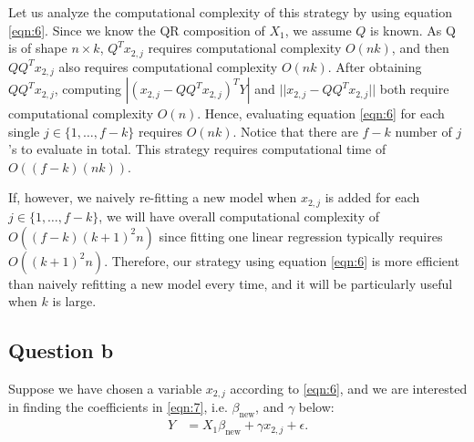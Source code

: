 \documentclass[12pt]{article}
\newcommand{\xln}[1]{x_{#1}}
\newcommand{\bet}{\beta}
\newcommand{\betln}[1]{\bet_{#1}}
\begin{document}
Let us analyze the computational complexity of this strategy 
by using equation \eqref{eqn:6}. Since we know the QR composition of
$X_1$, we assume $Q$ is known. As Q is of shape $n \times k$,
$Q^T x_{2,j}$ requires computational complexity $O(nk)$, and then
$QQ^Tx_{2,j}$ also requires computational complexity $O(nk)$.
After obtaining $QQ^Tx_{2,j}$, computing $|(x_{2,j} - QQ^Tx_{2,j})^TY |$
and ${||x_{2,j} - QQ^Tx_{2,j}||}$ both
require computational complexity $O(n)$. 
Hence, evaluating equation \eqref{eqn:6} for each single $j \in \{1, \ldots, f-k\}$
requires $O(nk)$.  Notice that there are $f-k$ number of $j$'s to evaluate in total.
This strategy requires computational time of $O((f-k)(nk))$. 

If, however, we naively re-fitting a new model when $x_{2,j}$ is added
for each $j \in \{1, \ldots, f-k\}$,
we will have overall computational complexity of $O((f-k)(k+1)^2n)$
since fitting one linear regression typically requires $O((k+1)^2n)$.
Therefore, our strategy using equation \eqref{eqn:6} is more efficient
than naively refitting a new model every time, and it will be particularly
useful when $k$ is large.

\subsection{Question b}

 Suppose we have chosen a variable $x_{2,j}$ according to 
 \eqref{eqn:6}, and we are interested in finding the coefficients
 in \eqref{eqn:7}, i.e. $\betln{\text{new}}$, and $\gamma$ below:
 \begin{align} \label{eqn:14}
 	Y &= X_1 \betln{\text{new}} + \gamma \xln{2, j} + \epsilon. 
 \end{align}
 
\end{document}
